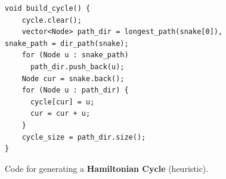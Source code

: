 \documentclass[12pt]{article}
\begin{document}
\begin{figure}[!h]
\begin{lstlisting}
void build_cycle() {
    cycle.clear();
    vector<Node> path_dir = longest_path(snake[0]), snake_path = dir_path(snake);
    for (Node u : snake_path)
      path_dir.push_back(u);
    Node cur = snake.back();
    for (Node u : path_dir) {
      cycle[cur] = u;
      cur = cur + u;
    }
    cycle_size = path_dir.size();
}
\end{lstlisting}
\caption{Code for generating a \textbf{Hamiltonian Cycle} (heuristic).}
\label{fig:cycle_code}
\end{figure}
\end{document}
